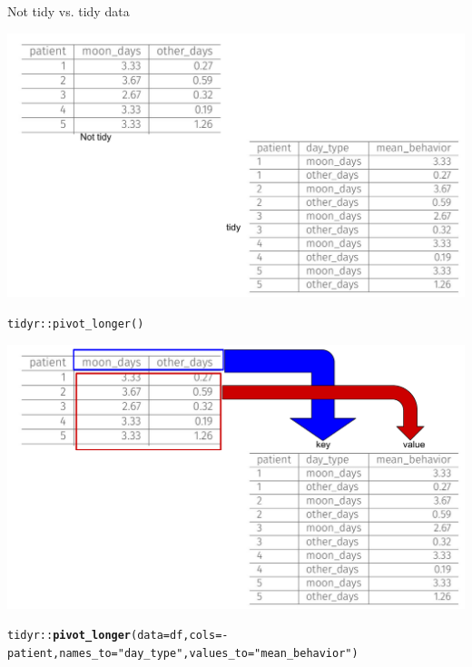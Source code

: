 \documentclass{beamer}\usepackage[]{graphicx}\usepackage[]{color}
\newcommand{\hlstr}[1]{\textcolor[rgb]{0.192,0.494,0.8}{#1}}%
\newcommand{\hlopt}[1]{\textcolor[rgb]{0,0,0}{#1}}%
\newcommand{\hlstd}[1]{\textcolor[rgb]{0.345,0.345,0.345}{#1}}%
\newcommand{\hlkwc}[1]{\textcolor[rgb]{0.333,0.667,0.333}{#1}}%
\newcommand{\hlkwd}[1]{\textcolor[rgb]{0.737,0.353,0.396}{\textbf{#1}}}%
\newenvironment{knitrout}{}{} %
\begin{document}
\begin{frame}[fragile]{Not tidy vs. tidy data}
	
	
	
	\includegraphics[scale=0.45]{figure/tidy4.pdf}
	
	
	
\end{frame}







\begin{frame}[fragile]{\texttt{tidyr::pivot\_longer()}}
	
	
	
	\includegraphics[scale=0.45]{figure/tidy1.pdf}
	
	
\begin{knitrout}\tiny
{}\color{fgcolor}
\begin{alltt}
\hlstd{tidyr}\hlopt{::}\hlkwd{pivot_longer}\hlstd{(}\hlkwc{data} \hlstd{= df,} \hlkwc{cols} \hlstd{=} \hlopt{-}\hlstd{patient,} \hlkwc{names_to} \hlstd{=} \hlstr{"day_type"}\hlstd{,} \hlkwc{values_to} \hlstd{=} \hlstr{"mean_behavior"}\hlstd{)}
\end{alltt}

\end{knitrout}
	
	
\end{frame}
\end{document}
